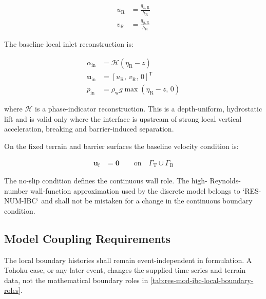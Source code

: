 \begin{align}
  u_{\mathrm{R}}
  &=
  \frac{
    q_{x,\mathrm{R}}
  }{
    h_{\mathrm{R}}
  }
  \label{eq:res-mod-ibc-regional-to-local-u}
  \\
  v_{\mathrm{R}}
  &=
  \frac{
    q_{y,\mathrm{R}}
  }{
    h_{\mathrm{R}}
  }
  \label{eq:res-mod-ibc-regional-to-local-v}
\end{align}

The baseline local inlet reconstruction is:

\begin{align}
  \alpha_{\mathrm{in}}
  &=
  \mathcal{H}
  \left(
    \eta_{\mathrm{R}}-z
  \right)
  \label{eq:res-mod-ibc-local-inlet-alpha}
  \\
  \mathbf{u}_{\mathrm{in}}
  &=
  \left[
    u_{\mathrm{R}},\,
    v_{\mathrm{R}},\,
    0
  \right]^{\mathsf{T}}
  \label{eq:res-mod-ibc-local-inlet-velocity}
  \\
  p_{\mathrm{in}}
  &=
  \rho_{\mathrm{w}} g
  \max
  \left(
    \eta_{\mathrm{R}}-z,\,
    0
  \right)
  \label{eq:res-mod-ibc-local-inlet-pressure}
\end{align}

where $\mathcal{H}$ is a phase-indicator reconstruction. This is a
depth-uniform, hydrostatic lift and is valid only where the interface
is upstream of strong local vertical acceleration, breaking and
barrier-induced separation.

On the fixed terrain and barrier surfaces the baseline velocity
condition is:

\begin{align}
  \mathbf{u}_{\mathrm{f}}
  &=
  \mathbf{0}
  \qquad
  \mathrm{on}
  \quad
  \Gamma_{\mathrm{T}}
  \cup
  \Gamma_{\mathrm{B}}
  \label{eq:res-mod-ibc-local-no-slip}
\end{align}

The no-slip condition defines the continuous wall role. The high-
Reynolds-number wall-function approximation used by the discrete model
belongs to `RES-NUM-IBC` and shall not be mistaken for a change in the
continuous boundary condition.

\subsection{Model Coupling Requirements}
\label{sec:res-mod-ibc-model-coupling-requirements}


The local boundary histories shall remain event-independent in
formulation. A Tohoku case, or any later event, changes the supplied
time series and terrain data, not the mathematical boundary roles in
\cref{tab:res-mod-ibc-local-boundary-roles}.

